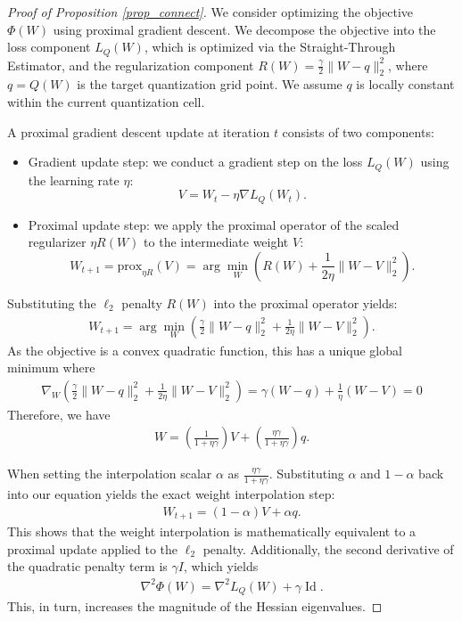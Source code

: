 \documentclass[10pt,a4paper]{amsart}
\DeclareMathOperator{\id}{Id}
\newcommand{\norm}[1]{\|#1\|}
\begin{document}
\begin{proof}[Proof of Proposition \ref{prop_connect}]
We consider optimizing the objective $\Phi(W)$ using proximal gradient descent. We decompose the objective into the loss component $L_Q(W)$, which is optimized via the Straight-Through Estimator, and the regularization component $R(W) = \frac{\gamma}{2} \norm{W - q}_2^2$, where $q = Q(W)$ is the target quantization grid point. We assume $q$ is locally constant within the current quantization cell.

A proximal gradient descent update at iteration $t$ consists of two components: 
\begin{itemize}
    \item Gradient update step: we conduct a gradient step on the loss $L_Q(W)$ using the learning rate $\eta$: 
    \[V = W_t - \eta \nabla L_Q(W_t).\]
    \item Proximal update step: we apply the proximal operator of the scaled regularizer $\eta R(W)$ to the intermediate weight $V$:
    \[W_{t+1} = \text{prox}_{\eta R}(V) = \arg\min_W \left( R(W) + \frac{1}{2\eta} \|W - V\|_2^2 \right).\]
\end{itemize} 

Substituting the $\ell_2$ penalty $R(W)$ into the proximal operator yields:
\begin{align*}
W_{t+1} = \arg\min_W \left( \frac{\gamma}{2} \norm{W - q}_2^2 + \frac{1}{2\eta} \norm{W - V}_2^2 \right).    
\end{align*}
As the objective is a convex quadratic function, this has a unique global minimum where 
\begin{align*}
\nabla_W \left( \frac{\gamma}{2} \|W - q\|_2^2 + \frac{1}{2\eta} \|W - V\|_2^2 \right) = \gamma(W - q) + \frac{1}{\eta}(W - V) = 0    
\end{align*}
Therefore, we have
\begin{align*}
W = \left( \frac{1}{1 + \eta \gamma} \right) V + \left( \frac{\eta \gamma}{1 + \eta \gamma} \right) q. 
\end{align*}

When setting the interpolation scalar $\alpha$ as $\frac{\eta \gamma}{1 + \eta \gamma}$. Substituting $\alpha$ and $1 - \alpha$ back into our equation yields the exact weight interpolation step:
\begin{align*}
W_{t+1} = (1 - \alpha) V + \alpha q.     
\end{align*}
This shows that the weight interpolation is mathematically equivalent to a proximal update applied to the $\ell_2$ penalty.
Additionally, the second derivative of the quadratic penalty term is $\gamma I$, which yields
\begin{align*}
\nabla^2 \Phi(W) = \nabla^2 L_Q(W) + \gamma \id.     
\end{align*}
This, in turn, increases the magnitude of the Hessian eigenvalues.
\end{proof}
\end{document}
